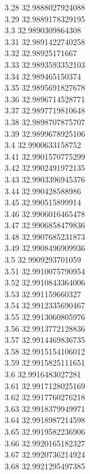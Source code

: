{3.28	32.9888027924088\\
3.29	32.9889178329195\\
3.3	32.9890309864308\\
3.31	32.9891422740258\\
3.32	32.98925171667\\
3.33	32.9893593352103\\
3.34	32.989465150374\\
3.35	32.9895691827678\\
3.36	32.9896714528771\\
3.37	32.9897719810648\\
3.38	32.9898707875707\\
3.39	32.9899678925106\\
3.4	32.9900633158752\\
3.41	32.9901570775299\\
3.42	32.9902491972135\\
3.43	32.9903396945376\\
3.44	32.990428588986\\
3.45	32.990515899914\\
3.46	32.9906016465478\\
3.47	32.9906858479836\\
3.48	32.9907685231873\\
3.49	32.9908496909936\\
3.5	32.9909293701059\\
3.51	32.9910075790954\\
3.52	32.9910843364006\\
3.53	32.991159660327\\
3.54	32.9912335690467\\
3.55	32.9913060805976\\
3.56	32.9913772128836\\
3.57	32.9914469836735\\
3.58	32.9915154106012\\
3.59	32.9915825111651\\
3.6	32.9916483027281\\
3.61	32.9917128025169\\
3.62	32.9917760276218\\
3.63	32.9918379949971\\
3.64	32.9918987214598\\
3.65	32.9919582236906\\
3.66	32.9920165182327\\
3.67	32.9920736214924\\
3.68	32.9921295497385\\
}
